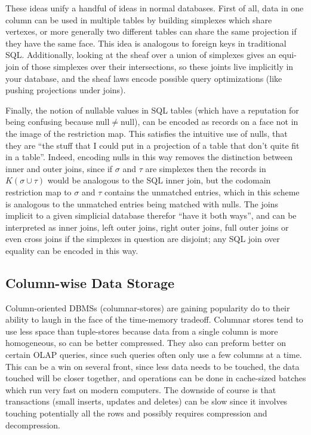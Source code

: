 \documentclass[a4paper,12pt]{article}
\theoremstyle{mydef}
\theoremstyle{myremark}
\begin{document}
These ideas unify a handful of ideas in normal databases.
First of all, data in one column can be used in multiple tables by building simplexes which share vertexes, or more generally two different tables can share the same projection if they have the same face.
This idea is analogous to foreign keys in traditional SQL.
Additionally, looking at the sheaf over a union of simplexes gives an equi-join of those simplexes over their intersections, so these joints live implicitly in your database, and the sheaf laws encode possible query optimizations (like pushing projections under joins).

Finally, the notion of nullable values in SQL tables (which have a reputation for being confusing because null$\ne$null), can be encoded as records on a face not in the image of the restriction map.  
This satisfies the intuitive use of nulls, that they are ``the stuff that I could put in a projection of a table that don't quite fit in a table''.  
Indeed, encoding nulls in this way removes the distinction between inner and outer joins, since if $\sigma$ and $\tau$ are simplexes then the records in $K(\sigma\cup\tau)$ would be analogous to the SQL inner join, but the codomain restriction map to $\sigma$ and $\tau$ contains the unmatched entries, which in this scheme is analogous to the unmatched entries being matched with nulls.  
The joins implicit to a given simplicial database therefor ``have it both ways'', and can be interpreted as inner joins, left outer joins, right outer joins, full outer joins or even cross joins if the simplexes in question are disjoint; any SQL join over equality can be encoded in this way.  

\subsection{Column-wise Data Storage}

Column-oriented DBMSs (columnar-stores) are gaining popularity do to their ability to laugh in the face of the time-memory tradeoff.
Columnar stores tend to use less space than tuple-stores because data from a single column is more homogeneous, so can be better compressed.  
They also can preform better on certain OLAP queries, since such queries often only use a few columns at a time.
This can be a win on several front, since less data needs to be touched, the data touched will be closer together, and operations can be done in cache-sized batches which run very fast on modern computers.   
The downside of course is that transactions (small inserts, updates and deletes) can be slow since it involves touching potentially all the rows and possibly requires compression and decompression.  
\end{document}

